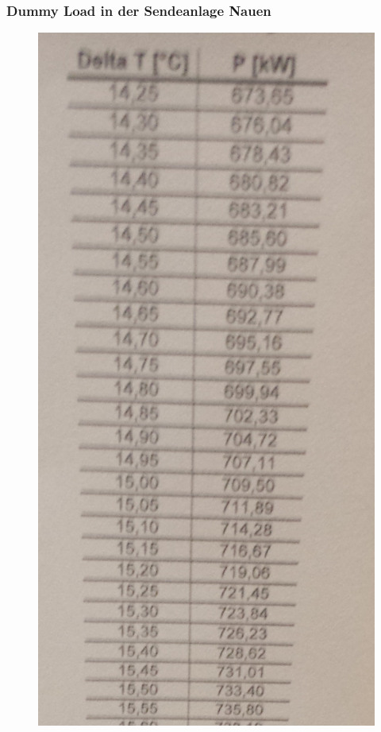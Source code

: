 \begin{frame}
  \frametitle{Dummy Load in der Sendeanlage Nauen}
  \begin{minipage}{0.4\textwidth}
    \begin{center}
      \begin{figure}
        \includegraphics[width=.9\textwidth,height=.8\textheight,keepaspectratio]{e17/DummyNauen.jpg}

\end{figure}
\end{center}
\end{minipage}
\end{frame}
